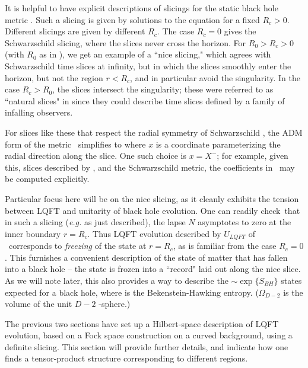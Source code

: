 
It is helpful to have explicit descriptions of slicings for the static black hole metric \schmet. Such a slicing is given by solutions to the equation
%
\eqn{}
%
for a fixed $R_c>0$.  Different slicings are given by different $R_c$.  The case $R_c=0$ gives the Schwarzschild slicing, where the slices never cross the horizon.  For $R_0>R_c>0$ (with $R_0$ as in \singcurv), we get an example of a ``nice slicing," which agrees with Schwarzschild time slices at infinity, but in which the slices smoothly enter the horizon, but not the region $r<R_c$, and in particular avoid the singularity.  In the case $R_c>R_0$, the slices intersect the singularity; these were referred to as ``natural slices" in  since they could describe time slices defined by a family of infalling observers.

For slices like these that respect the radial symmetry of Schwarzschild \schmet, the ADM form of the metric \admdec\ simplifies to
%
\eqn{}
%
where $x$ is a coordinate parameterizing the radial direction along the slice.  One such choice is $x=X^-$; for example, given this, slices described by \sldef, and the Schwarzschild metric, the coefficients in \admrad\ may be computed explicitly.


Particular focus here will be on the nice slicing, as it cleanly exhibits the tension between LQFT and unitarity of black hole evolution.  One can readily check\QBHB\ that in such a slicing ({\it e.g.} as just described), the lapse $N$ asymptotes to zero at the inner boundary $r=R_c$.  Thus LQFT evolution described by $U_{LQFT}$ of \unitop\ corresponds to {\it freezing} of the state at $r=R_c$, as is familiar from the case $R_c=0$.  This furnishes a convenient description of the state of matter that has fallen into a black hole -- the state is frozen into a ``record" laid out along the nice slice.   As we will note later, this also provides a way to describe the $\sim \exp\{S_{BH}\}$ states expected for a black hole,
where 
%
\eqn{}
%
is the Bekenstein-Hawking entropy.  ($\Omega_{D-2}$ is the volume of the unit $D-2$ -sphere.)


The previous two sections have set up a Hilbert-space description of LQFT evolution, based on a Fock space construction on a curved background, using a definite slicing.  This section will provide further details, and indicate how one finds a tensor-product structure corresponding to different regions.

